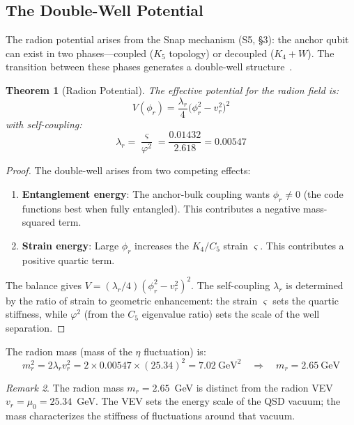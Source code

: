 \documentclass[11pt,a4paper]{article}
\newtheorem{theorem}{Theorem}[section]
\theoremstyle{definition}
\theoremstyle{remark}
\newtheorem{remark}[theorem]{Remark}
\newcommand{\strain}{\varsigma}
\newcommand{\gr}{\varphi}
\newcommand{\murad}{\mu_0}
\begin{document}
\subsection{The Double-Well Potential}

The radion potential arises from the Snap mechanism (S5, \S3): the anchor qubit can exist in two phases---coupled ($K_5$ topology) or decoupled ($K_4 + W$). The transition between these phases generates a double-well structure~\cite{RandallSundrum1999}.

\begin{theorem}[Radion Potential]
\label{thm:potential}
The effective potential for the radion field is:
\begin{equation}
\boxed{V(\phi_r) = \frac{\lambda_r}{4}\big(\phi_r^2 - v_r^2\big)^2}
\end{equation}
with self-coupling:
\begin{equation}
\lambda_r = \frac{\strain}{\gr^2} = \frac{0.01432}{2.618} = 0.00547
\end{equation}
\end{theorem}

\begin{proof}
The double-well arises from two competing effects:
\begin{enumerate}[nosep]
\item \textbf{Entanglement energy}: The anchor-bulk coupling wants $\phi_r \neq 0$ (the code functions best when fully entangled). This contributes a negative mass-squared term.
\item \textbf{Strain energy}: Large $\phi_r$ increases the $K_4/C_5$ strain $\strain$. This contributes a positive quartic term.
\end{enumerate}

The balance gives $V = (\lambda_r/4)(\phi_r^2 - v_r^2)^2$. The self-coupling $\lambda_r$ is determined by the ratio of strain to geometric enhancement: the strain $\strain$ sets the quartic stiffness, while $\gr^2$ (from the $C_5$ eigenvalue ratio) sets the scale of the well separation.
\end{proof}

The radion mass (mass of the $\eta$ fluctuation) is:
\begin{equation}
m_r^2 = 2\lambda_r v_r^2 = 2 \times 0.00547 \times (25.34)^2 = 7.02~\text{GeV}^2 \quad \Rightarrow \quad m_r = 2.65~\text{GeV}
\end{equation}

\begin{remark}
The radion mass $m_r = 2.65$~GeV is distinct from the radion VEV $v_r = \murad = 25.34$~GeV. The VEV sets the energy scale of the QSD vacuum; the mass characterizes the stiffness of fluctuations around that vacuum.
\end{remark}
\end{document}
